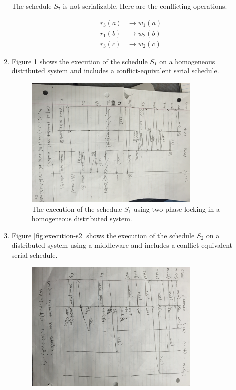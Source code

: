 \documentclass{article}
\begin{document}
\begin{enumerate}
        The schedule $S_2$ is not serializable. Here are the conflicting
        operations.

        \begin{align*}
            r_3 (a) &\to w_1 (a) \\
            r_1 (b) &\to w_2 (b) \\
            r_3 (c) &\to w_2 (c)
        \end{align*}

    \item
        Figure \ref{fig:execution-s1} shows the execution of the schedule $S_1$
        on a homogeneous distributed system and includes a conflict-equivalent
        serial schedule.

        \begin{figure}[ht]
            \includegraphics[width=0.8\textwidth]{homogeneous.jpg}

            \caption{
                The execution of the schedule $S_1$ using two-phase locking in
                a homogeneous distributed system.
            }
            \label{fig:execution-s1}
        \end{figure}

    \item
        Figure \ref{fig:execution-s2} shows the execution of the schedule $S_2$
        on a distributed system using a middleware and includes a
        conflict-equivalent serial schedule.

        \begin{figure}[ht]
            \includegraphics[width=0.8\textwidth]{middleware.jpg}


\end{figure}
\end{enumerate}
\end{document}
